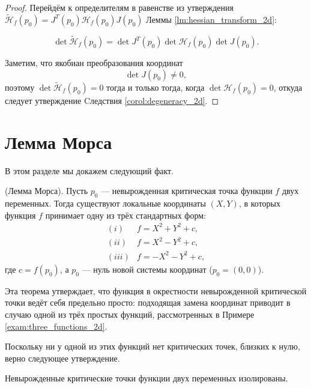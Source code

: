 \documentclass[a4paper,12pt,openany,leqno]{extbook}
\begin{document}
\begin{proof}
Перейдём к определителям в равенстве из утверждения $\widetilde{\mathcal{H}}_f(p_0) = J^T(p_0)\mathcal{H}_f(p_0)J(p_0)$ Леммы \ref{lm:hessian_transform_2d}: 

\begin{equation}
\det\widetilde{\mathcal{H}}_f(p_0) = \det J^T(p_0)\det\mathcal{H}_f(p_0)\det J(p_0).
\end{equation}

Заметим, что якобиан преобразования координат
\begin{equation}
\det J(p_0) \neq 0,
\end{equation}
поэтому $\det\widetilde{\mathcal{H}}_f(p_0) = 0$ тогда и только тогда, когда $\det\mathcal{H}_f(p_0) = 0$, откуда следует утверждение Cледствия \ref{corol:degeneracy_2d}.    
\end{proof}

\section{Лемма Морса}
В этом разделе мы докажем следующий факт.

\begin{theorem} (Лемма Морса). Пусть $p_0$ --- невырожденная критическая точка функции $f$ двух переменных. Тогда существуют локальные координаты $(X, Y)$, в которых функция $f$ принимает одну из трёх стандартных форм:
%
\[
  \begin{array}{rl}
   (i) & f = X^2 + Y^2 + c,\\
   (ii) & f = X^2 - Y^2 + c,\\
   (iii) & f = -X^2 - Y^2 + c,
  \end{array}
\]
%
где $c = f(p_0)$, а $p_0$ --- нуль новой системы координат ($p_0 = (0, 0)$).
\label{thm:morse_lemma_2d}
\end{theorem}

Эта теорема утверждает, что функция в окрестности невырожденной критической точки ведёт себя предельно просто: подходящая замена координат приводит в случаю одной из трёх простых функций, рассмотренных в Примере \ref{exam:three_functions_2d}.

Поскольку ни у одной из этих функций нет критических точек, близких к нулю, верно следующее утверждение.

\begin{corollary}
Невырожденные критические точки функции двух переменных изолированы.
\label{corol:crit_points_isolated_2d}
\end{corollary}
\end{document}

